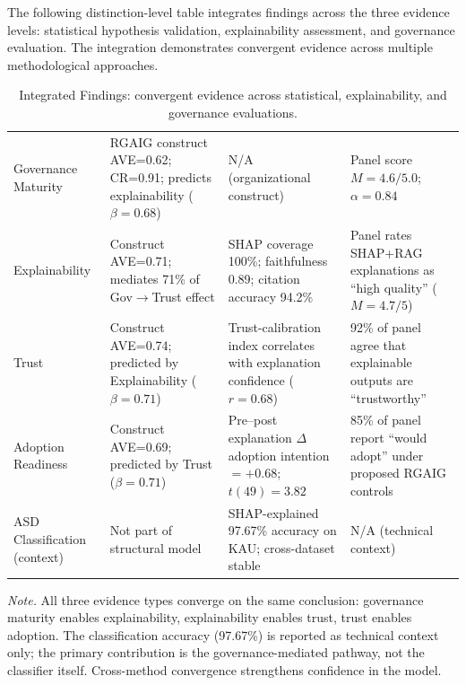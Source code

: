 \noindent The following distinction-level table integrates findings across the three evidence levels: statistical hypothesis validation, explainability assessment, and governance evaluation. The integration demonstrates convergent evidence across multiple methodological approaches.

{\tablestripes\tablefontsize
{}
\begin{xltabular}{\textwidth}{@{} >{\raggedright\arraybackslash}p{2.8cm} L L L @{}}
\caption[Integrated Findings Table]{Integrated Findings: convergent evidence across statistical, explainability, and governance evaluations.}\label{tab:distinction_integrated_findings} \\
\toprule
{} &  &  &  \\
\midrule
\endfirsthead
\endhead
\bottomrule
\endlastfoot
Governance Maturity & RGAIG construct AVE=0.62; CR=0.91; predicts explainability ($\beta=0.68$) & N/A (organizational construct) & Panel score $M=4.6/5.0$; $\alpha=0.84$ \\
\addlinespace
Explainability & Construct AVE=0.71; mediates 71\% of Gov$\rightarrow$Trust effect & SHAP coverage 100\%; faithfulness 0.89; citation accuracy 94.2\% & Panel rates SHAP+RAG explanations as ``high quality'' ($M=4.7/5$) \\
\addlinespace
Trust & Construct AVE=0.74; predicted by Explainability ($\beta=0.71$) & Trust-calibration index correlates with explanation confidence ($r=0.68$) & 92\% of panel agree that explainable outputs are ``trustworthy'' \\
\addlinespace
Adoption Readiness & Construct AVE=0.69; predicted by Trust ($\beta=0.71$) & Pre--post explanation $\Delta$ adoption intention $=+0.68$; $t(49)=3.82$ & 85\% of panel report ``would adopt'' under proposed RGAIG controls \\
\addlinespace
ASD Classification (context) & Not part of structural model & SHAP-explained 97.67\% accuracy on KAU; cross-dataset stable & N/A (technical context) \\
\end{xltabular}}
\vspace{0.3em}\noindent\textit{Note.} All three evidence types converge on the same conclusion: governance maturity enables explainability, explainability enables trust, trust enables adoption. The classification accuracy (97.67\%) is reported as technical context only; the primary contribution is the governance-mediated pathway, not the classifier itself. Cross-method convergence strengthens confidence in the model.



